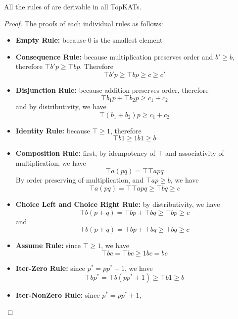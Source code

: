 \begin{theorem}\label{the: incor logic rule sound ok}
    All the rules of 
    are derivable in all TopKATs.
\end{theorem}

\begin{proof}
    The proofs of each individual rules as follows:
    \begin{itemize}
        \item \textbf{Empty Rule:}
            because 0 is the smallest element 
        \item \textbf{Consequence Rule:}
            because multiplication preserves order
            and \(b' \geq b\), therefore \(\top b' p \geq \top b p\).
            Therefore 
            \[\top b' p \geq \top b p \geq c \geq c'\] 
        \item \textbf{Disjunction Rule:}
            because addition preserves order, therefore 
            \[\top b_1 p + \top b_2 p \geq c_1 + c_2\]
            and by distributivity, we have 
            \[\top (b_1 + b_2) p \geq c_1 + c_2\]
        \item \textbf{Identity Rule:}
            because \(\top \geq 1\),
            therefore \[\top b 1 \geq 1 b 1 \geq b\]
        \item \textbf{Composition Rule:}
            first, by idempotency of \(\top\)
            and associativity of multiplication, we have 
            \[\top a (p q) = \top \top a p q\]
            By order preserving of multiplication, 
            and \(\top a p \geq b\),
            we have \[\top a (p q) = \top \top a p q \geq \top b q \geq c\]
        \item \textbf{Choice Left and Choice Right Rule:}
            by distributivity, we have 
            \[\top b (p + q) 
            = \top b p + \top b q 
            \geq \top b p \geq c\]
            and 
            \[\top b (p + q) 
            = \top b p + \top b q 
            \geq \top b q \geq c\]
        \item \textbf{Assume Rule:}
            since \(\top \geq 1\), 
            we have \[\top b c = \top b c \geq 1 b c = bc\]
        \item \textbf{Iter-Zero Rule:}
            since \({p}^* = p {p}^* + 1\),
            we have 
            \[\top b {p}^* 
            = \top b (p {p}^* + 1)
            \geq \top b 1 \geq b\]
        \item \textbf{Iter-NonZero Rule:}
            since \({p}^* = p {p}^* + 1\),

\end{itemize}
\end{proof}
